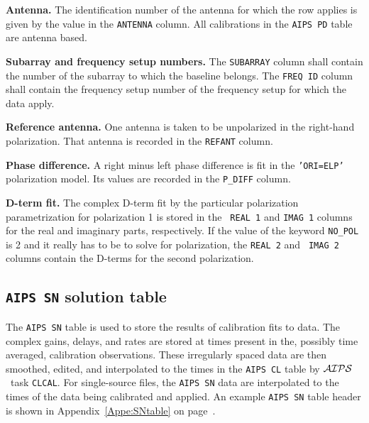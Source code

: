 \documentclass[twoside]{article}
\newcommand{\AIPS}{{$\cal AIPS\/$}}
\begin{document}
{\bf Antenna.} The identification number of the antenna for which the
row applies is given by the value in the {\tt ANTENNA} column.  All
calibrations in the {\tt AIPS PD} table are antenna based.

{\bf Subarray  and frequency setup numbers.} The {\tt SUBARRAY} column
shall contain the number of the subarray to which the baseline belongs.
The {\tt FREQ ID} column shall contain the frequency setup number of
the frequency setup for which the data apply.

{\bf Reference antenna.} One antenna is taken to be unpolarized in the
right-hand polarization.  That antenna is recorded in the {\tt REFANT}
column.

{\bf Phase difference.} A right minus left phase difference is fit
in the {\tt 'ORI=ELP'} polarization model.  Its values are recorded in
the {\tt P\_DIFF} column.

{\bf D-term fit.} The complex D-term fit by the particular
polarization parametrization for polarization 1 is stored in the {\tt
  REAL 1} and {\tt IMAG 1} columns for the real and imaginary parts,
respectively.  If the value of the keyword {\tt NO\_POL} is 2 and it
really has to be to solve for polarization, the {\tt REAL 2} and {\tt
  IMAG 2} columns contain the D-terms for the second polarization.

\subsection{{\tt AIPS SN} solution table}
\label{s:SN}

The {\tt AIPS SN} table is used to store the results of calibration
fits to data.  The complex gains, delays, and rates are stored at
times present in the, possibly time averaged, calibration
observations.  These irregularly spaced data are then smoothed,
edited, and interpolated to the times in the {\tt AIPS CL} table by
\AIPS\ task {\tt CLCAL}\@.  For single-source files, the {\tt AIPS SN}
data are interpolated to the times of the data being calibrated and
applied.  An example {\tt AIPS SN} table header is shown in
Appendix~\ref{Appe:SNtable} on page~\pageref{Appe:SNtable}.
\end{document}
